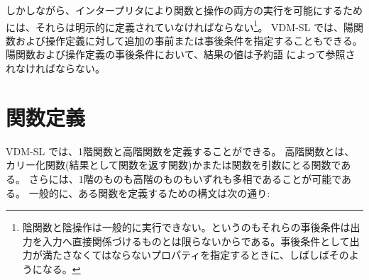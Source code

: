 \documentclass[\pformat,12pt]{jarticle}
\newcommand{\vdmslpp}[2]{%
#1
}
\newcommand{\vdmpp}{VDM++}
\begin{document}
しかしながら、インタープリタにより関数と操作の両方の実行を可能にするためには、それらは明示的に定義されていなければならない\footnote{陰関数と陰操作は一般的に実行できない。というのもそれらの事後条件は出力を入力へ直接関係づけるものとは限らないからである。事後条件として出力が満たさなくてはならないプロパティを指定するときに、しばしばそのようになる。}。
\vdmslpp{VDM-SL}{\vdmpp}では、陽関数および操作定義に対して追加の事前または事後条件を指定することもできる。
陽関数および操作定義の事後条件において、結果の値は予約語 によって参照されなければならない。
 
\section{関数定義}\label{functiondef}

\vdmslpp{VDM-SL}{\vdmpp}では、1階関数と高階関数を定義することができる。 
高階関数とは、カリー化関数(結果として関数を返す関数)かまたは関数を引数にとる関数である。
さらには、1階のものも高階のものもいずれも多相であることが可能である。
一般的に、ある関数を定義するための構文は次の通り:







\end{document}
